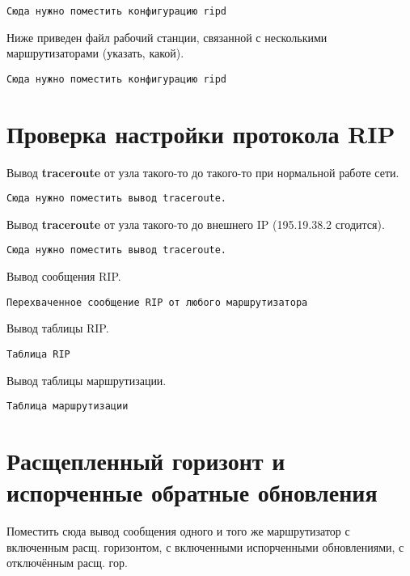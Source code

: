 \documentclass[a4paper,12pt]{article}
\begin{document}
\begin{Verbatim}
Сюда нужно поместить конфигурацию ripd
\end{Verbatim}


Ниже приведен файл  рабочий станции, связанной с несколькими маршрутизаторами (указать, какой).

\begin{Verbatim}
Сюда нужно поместить конфигурацию ripd
\end{Verbatim}


\section{Проверка настройки протокола RIP}

Вывод \textbf{traceroute} от узла такого-то до такого-то при нормальной работе сети.

\begin{Verbatim}
Сюда нужно поместить вывод traceroute.
\end{Verbatim}

Вывод \textbf{traceroute} от узла такого-то до внешнего IP (195.19.38.2 сгодится).

\begin{Verbatim}
Сюда нужно поместить вывод traceroute.
\end{Verbatim}

Вывод сообщения RIP.

\begin{Verbatim}
Перехваченное сообщение RIP от любого маршрутизатора
\end{Verbatim}

Вывод таблицы RIP.

\begin{Verbatim}
Таблица RIP
\end{Verbatim}

Вывод таблицы маршрутизации.

\begin{Verbatim}
Таблица маршрутизации
\end{Verbatim}

\section{Расщепленный горизонт и испорченные обратные обновления}

Поместить сюда вывод сообщения одного и того же маршрутизатор с включенным расщ. горизонтом, с включенными испорченными обновлениями, с отключённым расщ. гор.
\end{document}
